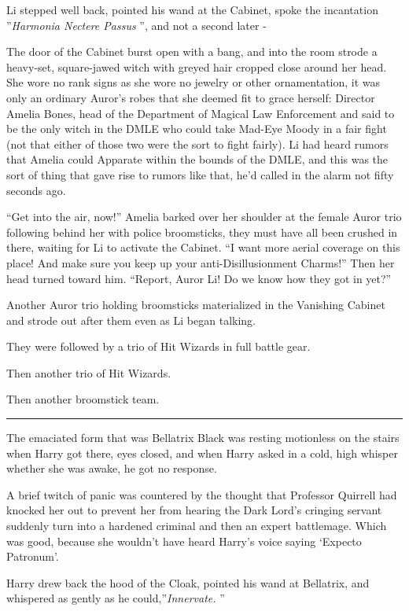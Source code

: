 Li stepped well back, pointed his wand at the Cabinet, spoke the
incantation ''\emph{Harmonia Nectere Passus} '', and not a second later -

The door of the Cabinet burst open with a bang, and into the room strode
a heavy-set, square-jawed witch with greyed hair cropped close around
her head. She wore no rank signs as she wore no jewelry or other
ornamentation, it was only an ordinary Auror's robes that she deemed fit
to grace herself: Director Amelia Bones, head of the Department of
Magical Law Enforcement and said to be the only witch in the DMLE who
could take Mad-Eye Moody in a fair fight (not that either of those two
were the sort to fight fairly). Li had heard rumors that Amelia could
Apparate within the bounds of the DMLE, and this was the sort of thing
that gave rise to rumors like that, he'd called in the alarm not fifty
seconds ago.

``Get into the air, now!'' Amelia barked over her shoulder at the female
Auror trio following behind her with police broomsticks, they must have
all been crushed in there, waiting for Li to activate the Cabinet. ``I
want more aerial coverage on this place! And make sure you keep up your
anti-Disillusionment Charms!'' Then her head turned toward him.
``Report, Auror Li! Do we know how they got in yet?''

Another Auror trio holding broomsticks materialized in the Vanishing
Cabinet and strode out after them even as Li began talking.

They were followed by a trio of Hit Wizards in full battle gear.

Then another trio of Hit Wizards.

Then another broomstick team.

\begin{center}\rule{3in}{0.4pt}\end{center}

The emaciated form that was Bellatrix Black was resting motionless on
the stairs when Harry got there, eyes closed, and when Harry asked in a
cold, high whisper whether she was awake, he got no response.

A brief twitch of panic was countered by the thought that Professor
Quirrell had knocked her out to prevent her from hearing the Dark Lord's
cringing servant suddenly turn into a hardened criminal and then an
expert battlemage. Which was good, because she wouldn't have heard
Harry's voice saying `Expecto Patronum'.

Harry drew back the hood of the Cloak, pointed his wand at Bellatrix,
and whispered as gently as he could,''\emph{Innervate.} ''

